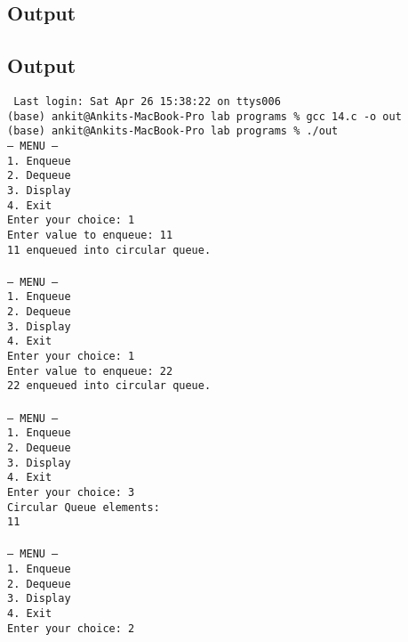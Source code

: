 \documentclass[12pt,a4paper]{article}
\begin{document}
\subsection*{Output}
\newpage
\subsection*{Output}
\begin{tcolorbox}[terminalstyle, title=Sample Output]
\texttt{
Last login: Sat Apr 26 15:38:22 on ttys006\\
(base) ankit@Ankits-MacBook-Pro lab programs \% gcc 14.c -o out\\
(base) ankit@Ankits-MacBook-Pro lab programs \% ./out\\
--- MENU ---\\
1. Enqueue\\
2. Dequeue\\
3. Display\\
4. Exit\\
Enter your choice: 1\\
Enter value to enqueue: 11\\
11 enqueued into circular queue.\\
\\
--- MENU ---\\
1. Enqueue\\
2. Dequeue\\
3. Display\\
4. Exit\\
Enter your choice: 1\\
Enter value to enqueue: 22\\
22 enqueued into circular queue.\\
\\
--- MENU ---\\
1. Enqueue\\
2. Dequeue\\
3. Display\\
4. Exit\\
Enter your choice: 3\\
Circular Queue elements:\\
11 \\
\\
--- MENU ---\\
1. Enqueue\\
2. Dequeue\\
3. Display\\
4. Exit\\
Enter your choice: 2\\
}
\end{tcolorbox}
\end{document}
